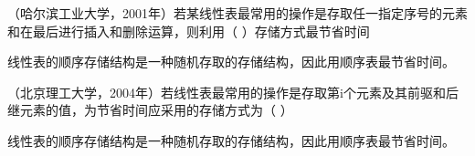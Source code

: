 \question （哈尔滨工业大学，2001年）若某线性表最常用的操作是存取任一指定序号的元素和在最后进行插入和删除运算，则利用（
）存储方式最节省时间
\par{}
\begin{solution}线性表的顺序存储结构是一种随机存取的存储结构，因此用顺序表最节省时间。
\end{solution}
\question （北京理工大学，2004年）若线性表最常用的操作是存取第i个元素及其前驱和后继元素的值，为节省时间应采用的存储方式为（
）
\par{}
\begin{solution}线性表的顺序存储结构是一种随机存取的存储结构，因此用顺序表最节省时间。
\end{solution}
